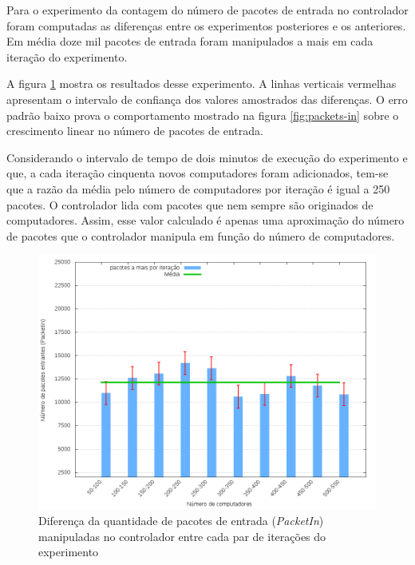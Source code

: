Para o experimento da contagem do número de pacotes de entrada no controlador
foram computadas as diferenças entre os experimentos posteriores e os
anteriores.
Em média doze mil pacotes de entrada foram manipulados a mais em cada 
iteração do experimento.

A figura \ref{fig:packets-in-stats} mostra os resultados desse experimento.
A linhas verticais vermelhas apresentam o intervalo de confiança dos valores
amostrados das diferenças. 
O erro padrão baixo prova o comportamento mostrado na figura 
\ref{fig:packets-in} sobre o crescimento linear no número de pacotes de 
entrada.

Considerando o intervalo de tempo de dois minutos de execução do experimento e 
que, a cada iteração cinquenta novos computadores foram adicionados, 
tem-se que a razão da média pelo número de computadores por iteração é igual 
a 250 pacotes. 
O controlador lida com pacotes que nem sempre são originados de computadores.
Assim, esse valor calculado é apenas uma aproximação do número de pacotes 
que o controlador manipula em função do número de computadores.

\begin{figure}[!htb]
    \centering
    \label{fig:packets-in-stats}
    \includegraphics[width=\linewidth]{img/packets-in-stats}
    \caption{Diferença da quantidade de pacotes de entrada (\emph{PacketIn})
    manipuladas no controlador entre cada par de iterações do experimento}
\end{figure}
